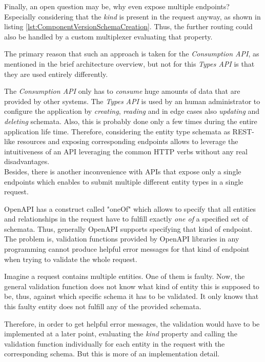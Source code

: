 Finally, an open question may be, why even expose multiple endpoints? Especially considering that the \emph{kind} is present in the request anyway, as shown in listing \ref{lst:ComponentVersionSchemaCreation}. Thus, the further routing could also be handled by a custom multiplexer evaluating that property.\par
The primary reason that such an approach is taken for the \emph{Consumption API}, as mentioned in the brief architecture overview, but not for this \emph{Types API} is that they are used entirely differently.\par
The \emph{Consumption API} only has to \emph{consume} huge amounts of data that are provided by other systems. The \emph{Types API} is used by an human administrator to configure the application by \emph{creating}, \emph{reading} and in edge cases also \emph{updating} and \emph{deleting} schemata. Also, this is probably done only a few times during the entire application life time. Therefore, considering the entity type schemata as REST-like resources and exposing corresponding endpoints allows to leverage the intuitiveness of an API leveraging the common HTTP verbs without any real disadvantages.\\

Besides, there is another inconvenience with APIs that expose only a single endpoints which enables to submit multiple different entity types in a single request.\par 
OpenAPI has a construct called "oneOf" which allows to specify that all entities and relationships in the request have to fulfill exactly \emph{one of} a specified set of schemata. Thus, generally OpenAPI supports specifying that kind of endpoint. The problem is, validation functions provided by OpenAPI libraries in any programming cannot produce helpful error messages for that kind of endpoint when trying to validate the whole request.\par 
Imagine a request contains multiple entities. One of them is faulty. Now, the general validation function does not know what kind of entity this is supposed to be, thus, against which specific schema it has to be validated. It only knows that this faulty entity does not fulfill any of the provided schemata.\par
Therefore, in order to get helpful error messages, the validation would have to be implemented at a later point, evaluating the \emph{kind} property and calling the validation function individually for each entity in the request with the corresponding schema. But this is more of an implementation detail.


